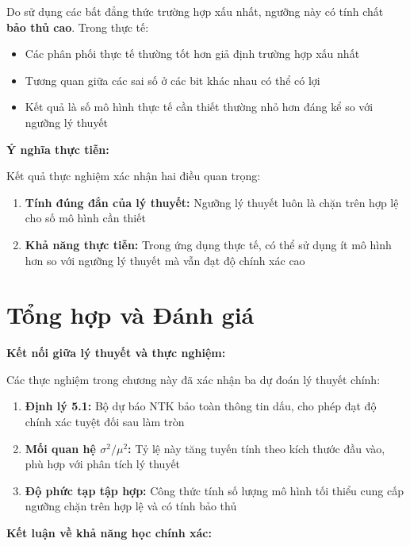 Do sử dụng các bất đẳng thức trường hợp xấu nhất, ngưỡng này có tính chất \textbf{bảo thủ cao}. Trong thực tế:
\begin{itemize}
    \item Các phân phối thực tế thường tốt hơn giả định trường hợp xấu nhất
    \item Tương quan giữa các sai số ở các bit khác nhau có thể có lợi
    \item Kết quả là số mô hình thực tế cần thiết thường nhỏ hơn đáng kể so với ngưỡng lý thuyết
\end{itemize}

\textbf{Ý nghĩa thực tiễn:}

\vspace{0.2cm}

Kết quả thực nghiệm xác nhận hai điều quan trọng:

\begin{enumerate}
    \item \textbf{Tính đúng đắn của lý thuyết:} Ngưỡng lý thuyết luôn là chặn trên hợp lệ cho số mô hình cần thiết
    \item \textbf{Khả năng thực tiễn:} Trong ứng dụng thực tế, có thể sử dụng ít mô hình hơn so với ngưỡng lý thuyết mà vẫn đạt độ chính xác cao
\end{enumerate}

\section{Tổng hợp và Đánh giá}

\textbf{Kết nối giữa lý thuyết và thực nghiệm:}

\vspace{0.2cm}

Các thực nghiệm trong chương này đã xác nhận ba dự đoán lý thuyết chính:
\begin{enumerate}
    \item \textbf{Định lý 5.1:} Bộ dự báo NTK bảo toàn thông tin dấu, cho phép đạt độ chính xác tuyệt đối sau làm tròn
    \item \textbf{Mối quan hệ $\sigma^2/\mu^2$:} Tỷ lệ này tăng tuyến tính theo kích thước đầu vào, phù hợp với phân tích lý thuyết
    \item \textbf{Độ phức tạp tập hợp:} Công thức tính số lượng mô hình tối thiểu cung cấp ngưỡng chặn trên hợp lệ và có tính bảo thủ
\end{enumerate}

\textbf{Kết luận về khả năng học chính xác:}

